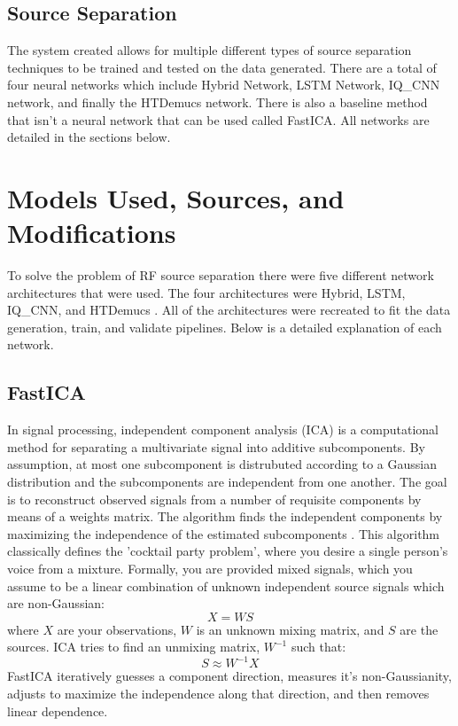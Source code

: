 \documentclass[conference]{IEEEtran}
\begin{document}
\subsection{Source Separation}
The system created allows for multiple different types of source separation techniques to be trained and tested on the data generated. There are a total of four neural networks which include Hybrid Network, LSTM Network, IQ\_CNN network, and finally the HTDemucs network. There is also a baseline method that isn't a neural network that can be used called FastICA. All networks are detailed in the sections below.

\section{Models Used, Sources, and Modifications}
To solve the problem of RF source separation there were five different network architectures that were used. The four architectures were Hybrid, LSTM, IQ\_CNN, and HTDemucs \cite{demucs_github}. All of the architectures were recreated to fit the data generation, train, and validate pipelines. Below is a detailed explanation of each network.
\subsection{FastICA}
    In signal processing, independent component analysis (ICA) is a computational method for separating a multivariate signal into additive subcomponents. By assumption, at most one subcomponent is distrubuted according to a Gaussian distribution and the subcomponents are independent from one another. The goal is to reconstruct observed signals from a number of requisite components by means of a weights matrix. The algorithm finds the independent components by maximizing the independence of the estimated subcomponents \cite{ica_wikipedia}. This algorithm classically defines the 'cocktail party problem', where you desire a single person's voice from a mixture. Formally, you are provided mixed signals, which you assume to be a linear combination of unknown independent source signals which are non-Gaussian: 
    \[
    X = WS
    \]
    where $X$ are your observations, $W$ is an unknown mixing matrix, and $S$ are the sources. ICA tries to find an unmixing matrix, $W^{-1}$ such that: 
    \[
    S \approx W^{-1}X
    \]
    FastICA iteratively guesses a component direction, measures it's non-Gaussianity, adjusts to maximize the independence along that direction, and then removes linear dependence. 
    
\end{document}
